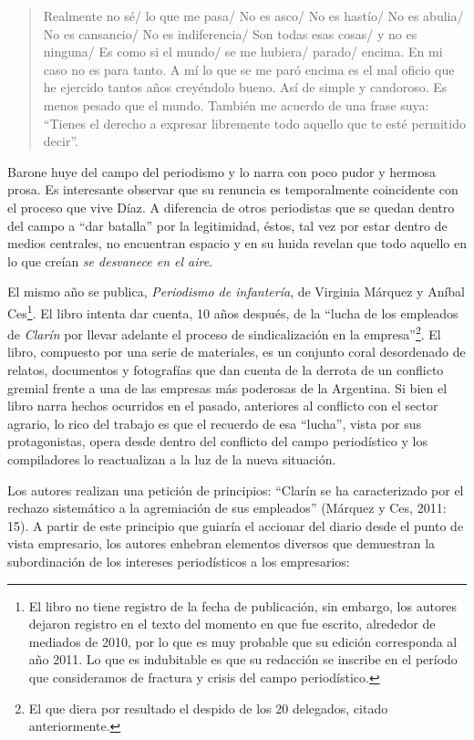 {\begin{quote}
Realmente no sé/ lo que me pasa/ No es asco/ No es hastío/ No es abulia/ No es cansancio/ No es indiferencia/ Son todas esas cosas/ y no es ninguna/ Es como si el mundo/ se me hubiera/ parado/ encima. En mi caso no es para tanto. A mí lo que se me paró encima es el mal oficio que he ejercido tantos años creyéndolo bueno. Así de simple y candoroso. Es menos pesado que el mundo. También me acuerdo de una frase suya: ``Tienes el derecho a expresar libremente todo aquello que te esté permitido decir''.
\end{quote}

Barone huye del campo del periodismo y lo narra con poco pudor y hermosa prosa. Es interesante observar que su renuncia es temporalmente coincidente con el proceso que vive Díaz. A diferencia de otros periodistas que se quedan dentro del campo a ``dar batalla'' por la legitimidad, éstos, tal vez por estar dentro de medios centrales, no encuentran espacio y en su huida revelan que todo aquello en lo que creían \emph{se desvanece en el aire}.

El mismo año se publica, \emph{Periodismo de infantería}, de Virginia Márquez y Aníbal Ces\footnote{El libro no tiene registro de la fecha de publicación, sin embargo, los autores dejaron registro en el texto del momento en que fue escrito, alrededor de mediados de 2010, por lo que es muy probable que su edición corresponda al año 2011. Lo que es indubitable es que su redacción se inscribe en el período que consideramos de fractura y crisis del campo periodístico.}. El libro intenta dar cuenta, 10 años después, de la ``lucha de los empleados de \emph{Clarín} por llevar adelante el proceso de sindicalización en la empresa''\footnote{El que diera por resultado el despido de los 20 delegados, citado anteriormente.}. El libro, compuesto por una serie de materiales, es un conjunto coral desordenado de relatos, documentos y fotografías que dan cuenta de la derrota de un conflicto gremial frente a una de las empresas más poderosas de la Argentina. Si bien el libro narra hechos ocurridos en el pasado, anteriores al conflicto con el sector agrario, lo rico del trabajo es que el recuerdo de esa ``lucha'', vista por sus protagonistas, opera desde dentro del conflicto del campo periodístico y los compiladores lo reactualizan a la luz de la nueva situación.

Los autores realizan una petición de principios: ``Clarín se ha caracterizado por el rechazo sistemático a la agremiación de sus empleados'' (Márquez y Ces, 2011: 15). A partir de este principio que guiaría el accionar del diario desde el punto de vista empresario, los autores enhebran elementos diversos que demuestran la subordinación de los intereses periodísticos a los empresarios:

}
